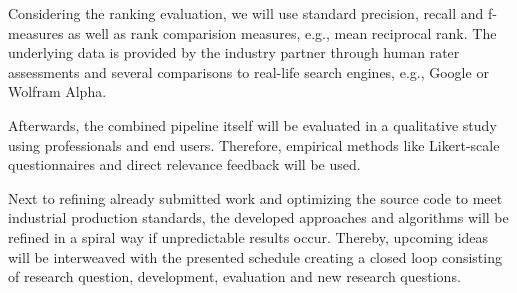 Considering the ranking evaluation, we will use standard precision, recall and f-measures as well as rank comparision measures, e.g., mean reciprocal rank. 
The underlying data is provided by the industry partner through human rater assessments and several comparisons to real-life search engines, e.g., Google or Wolfram Alpha.

Afterwards, the combined pipeline itself will be evaluated in a qualitative study using professionals and end users.
Therefore, empirical methods like Likert-scale questionnaires and direct relevance feedback will be used.


Next to refining already submitted work and optimizing the source code to meet industrial production standards, the developed approaches and algorithms will be refined in a spiral way if unpredictable results occur.
Thereby, upcoming ideas will be interweaved with the presented schedule creating a closed loop consisting of research question, development, evaluation and new research questions.
